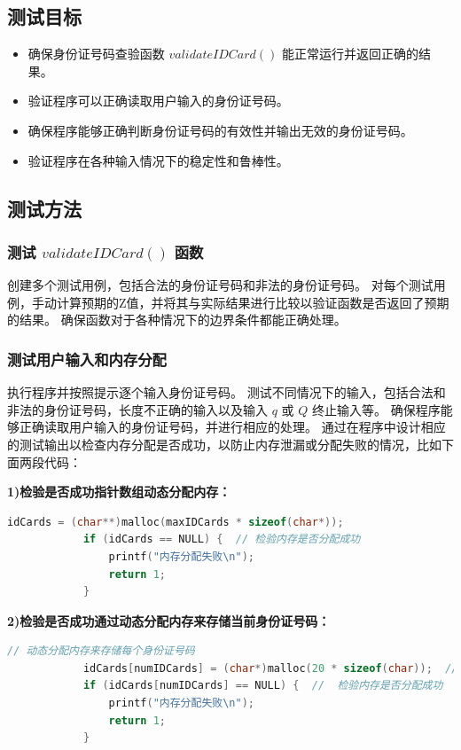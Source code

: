 \documentclass[withoutpreface,bwprint]{cumcmthesis}  %
\begin{document}
		\subsection{测试目标}
		\begin{itemize}
			\item 确保身份证号码查验函数 $validateIDCard()$ 能正常运行并返回正确的结果。
			\item 验证程序可以正确读取用户输入的身份证号码。
			\item 确保程序能够正确判断身份证号码的有效性并输出无效的身份证号码。
			\item 验证程序在各种输入情况下的稳定性和鲁棒性。
		\end{itemize}
		
		\subsection {测试方法}
		\subsubsection{测试 $validateIDCard()$ 函数}
		创建多个测试用例，包括合法的身份证号码和非法的身份证号码。
		对每个测试用例，手动计算预期的Z值，并将其与实际结果进行比较以验证函数是否返回了预期的结果。
		确保函数对于各种情况下的边界条件都能正确处理。
		\subsubsection{测试用户输入和内存分配}
		执行程序并按照提示逐个输入身份证号码。
		测试不同情况下的输入，包括合法和非法的身份证号码，长度不正确的输入以及输入 $q$ 或 $Q$ 终止输入等。
		确保程序能够正确读取用户输入的身份证号码，并进行相应的处理。
		通过在程序中设计相应的测试输出以检查内存分配是否成功，以防止内存泄漏或分配失败的情况，比如下面两段代码：
		
		
		\textbf{1)}\textbf{检验是否成功指针数组动态分配内存：}
		\begin{lstlisting}[language=c]
			idCards = (char**)malloc(maxIDCards * sizeof(char*));
			if (idCards == NULL) {  // 检验内存是否分配成功
				printf("内存分配失败\n");
				return 1;
			}
		\end{lstlisting}
		
		\textbf{2)}\textbf{检验是否成功通过动态分配内存来存储当前身份证号码：}
		\begin{lstlisting}[language=c]
			// 动态分配内存来存储每个身份证号码
			idCards[numIDCards] = (char*)malloc(20 * sizeof(char));  // 身份证号码长度为18位，最后一位为'\0'
			if (idCards[numIDCards] == NULL) {  //  检验内存是否分配成功
				printf("内存分配失败\n");
				return 1;
			}
		\end{lstlisting}	
		
\end{document}
